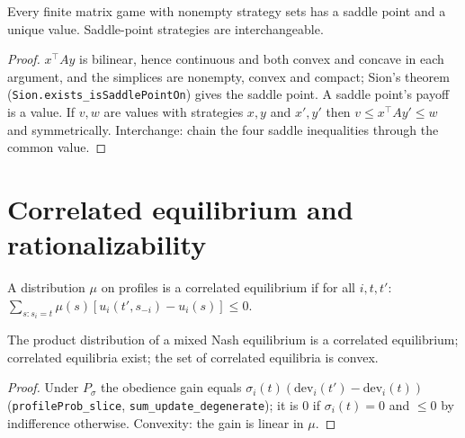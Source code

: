 \begin{theorem}
\label{thm:minimax}
\leanok
{}
Every finite matrix game with nonempty strategy sets has a saddle point and a unique value. Saddle-point
strategies are interchangeable.
\end{theorem}
\begin{proof}
\leanok
$x^\top A y$ is bilinear, hence continuous and both convex and concave in each argument, and the simplices are
nonempty, convex and compact; Sion's theorem (\texttt{Sion.exists\_isSaddlePointOn}) gives the saddle point.
A saddle point's payoff is a value. If $v, w$ are values with strategies $x, y$ and $x', y'$ then
$v \le x^\top A y' \le w$ and symmetrically. Interchange: chain the four saddle inequalities through the common
value.
\end{proof}

\section{Correlated equilibrium and rationalizability}
\label{sec:correlated}

\begin{definition}
\label{def:correlated}
\leanok
{}
A distribution $\mu$ on profiles is a correlated equilibrium if for all $i, t, t'$:
$\sum_{s : s_i = t}\mu(s)[u_i(t', s_{-i}) - u_i(s)] \le 0$.
\end{definition}

\begin{theorem}
\label{thm:correlated}
\leanok
{}
The product distribution of a mixed Nash equilibrium is a correlated equilibrium; correlated equilibria exist;
the set of correlated equilibria is convex.
\end{theorem}
\begin{proof}
\leanok
Under $P_\sigma$ the obedience gain equals $\sigma_i(t)(\mathrm{dev}_i(t') - \mathrm{dev}_i(t))$
(\texttt{profileProb\_slice}, \texttt{sum\_update\_degenerate}); it is $0$ if $\sigma_i(t) = 0$ and $\le 0$ by
indifference otherwise. Convexity: the gain is linear in $\mu$.
\end{proof}

